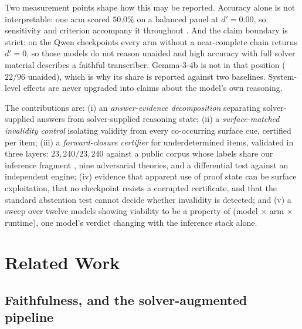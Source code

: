 \documentclass[10pt]{article}
\begin{document}
Two measurement points shape how this may be reported. Accuracy alone is not interpretable: one arm scored $50.0\%$ on a balanced panel at $d' = 0.00$, so sensitivity and criterion accompany it throughout
\citep{macmillan1991detection,stanislaw1999calculation}. And the claim boundary
is strict: on the Qwen checkpoints every arm without a near-complete chain
returns $d' = 0$, so those models do not reason unaided and high accuracy with
full solver material describes a faithful transcriber. Gemma-3-4b is not in that
position ($22/96$ unaided), which is why its share is reported against two
baselines. System-level effects are never upgraded into claims about the model's
own reasoning.

The contributions are: (i) an \emph{answer-evidence decomposition} separating
solver-supplied answers from solver-supplied reasoning state; (ii) a
\emph{surface-matched invalidity control} isolating validity from every
co-occurring surface cue, certified per item; (iii) a \emph{forward-closure
certifier} for underdetermined items, validated in three layers: $23{,}240/23{,}240$ against a public corpus whose
labels share our inference fragment \citep{tafjord2020proofwriter}, nine
adversarial theories, and a differential test against an independent engine; (iv) evidence that apparent use of proof state can be surface
exploitation, that no checkpoint resists a corrupted certificate, and that the
standard abstention test cannot decide whether invalidity is detected; and (v) a sweep over twelve models
\citep{team2024qwen,grattafiori2024llama,team2025gemma,microsoft2025phi,team2024olmo,allal2025smollm}
showing viability to be a property of (model $\times$ arm $\times$ runtime), one
model's verdict changing with the inference stack alone.

\section{Related Work}

\subsection{Faithfulness, and the solver-augmented pipeline}
\end{document}
